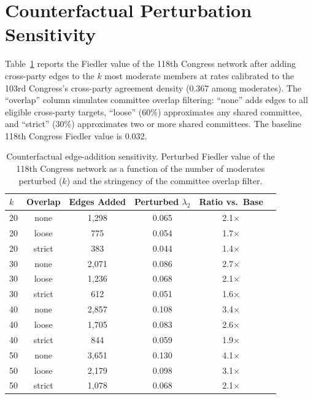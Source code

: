 \documentclass[12pt, a4paper]{article}
\begin{document}
\section{Counterfactual Perturbation Sensitivity}
\label{app:counterfactual}

Table~\ref{tab:counterfactual_sensitivity} reports the Fiedler value of the 118th Congress network after adding cross-party edges to the $k$ most moderate members at rates calibrated to the 103rd Congress's cross-party agreement density (0.367 among moderates). The ``overlap'' column simulates committee overlap filtering: ``none'' adds edges to all eligible cross-party targets, ``loose'' (60\%) approximates any shared committee, and ``strict'' (30\%) approximates two or more shared committees. The baseline 118th Congress Fiedler value is 0.032.

\begin{table}[H]
\centering
\caption{Counterfactual edge-addition sensitivity. Perturbed Fiedler value of the 118th Congress network as a function of the number of moderates perturbed ($k$) and the stringency of the committee overlap filter.}
\label{tab:counterfactual_sensitivity}
\small
\begin{tabular}{lccccc}
\toprule
$k$ & Overlap & Edges Added & Perturbed $\lambda_2$ & Ratio vs.\ Base \\
\midrule
20 & none   & 1,298 & 0.065 & 2.1$\times$ \\
20 & loose  &   775 & 0.054 & 1.7$\times$ \\
20 & strict &   383 & 0.044 & 1.4$\times$ \\
\midrule
30 & none   & 2,071 & 0.086 & 2.7$\times$ \\
30 & loose  & 1,236 & 0.068 & 2.1$\times$ \\
30 & strict &   612 & 0.051 & 1.6$\times$ \\
\midrule
40 & none   & 2,857 & 0.108 & 3.4$\times$ \\
40 & loose  & 1,705 & 0.083 & 2.6$\times$ \\
40 & strict &   844 & 0.059 & 1.9$\times$ \\
\midrule
50 & none   & 3,651 & 0.130 & 4.1$\times$ \\
50 & loose  & 2,179 & 0.098 & 3.1$\times$ \\
50 & strict & 1,078 & 0.068 & 2.1$\times$ \\
\bottomrule
\end{tabular}
\end{table}
\end{document}

